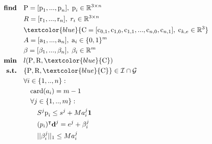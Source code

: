 \begin{align}
    \textrm{\textbf{find}}  \quad & \mbox{P}=[\mbox{p}_1,...,\mbox{p}_n], \; \mbox{p}_i \in \mathbb{R}^{3 \times n} \nonumber\\
                            \quad & R=[\mbox{r}_1,...,\mbox{r}_n], \; r_i \in \mathbb{R}^{3 \times n} \nonumber\\
                            \quad & \textcolor{blue}{\mbox{C}=[\mbox{c}_{0,1},\mbox{c}_{1,0},\mbox{c}_{1,1},...,\mbox{c}_{n,0},\mbox{c}_{n,1}], \; \mbox{c}_{k,e} \in \mathbb{R}^3} \nonumber\\
                            \quad & A=[\mbox{a}_1,...,\mbox{a}_n], \; \mbox{a}_i \in \{0,1\}^{m} \nonumber\\
                            \quad & \beta=[\beta_1,...,\beta_n], \; \beta_i \in \mathbb{R}^{m} \nonumber\\
    \textrm{\textbf{min}}  \quad & l(\mbox{P},\mbox{R},\textcolor{blue}{\mbox{C}}) \nonumber\\
    \textrm{\textbf{s.t.}}  \quad & \{\mbox{P},\mbox{R},\textcolor{blue}{\mbox{C}}\} \in \mathcal{I} \cap \mathcal{G} \nonumber\\
                            \quad & \forall i \in \{1,..,n\} : \nonumber\\
                                \quad & \quad \mbox{card}(a_i) = m-1  \nonumber\\
                                \quad & \quad \forall j \in \{1,..,m\} : \nonumber\\
                                    \quad & \quad \quad S^j \mbox{p}_i \leq s^j + M a_i^j \textbf{1} \nonumber\\
                                    \quad & \quad \quad (p_i)^{\intercal} \textbf{d}^j = e^j + \beta_i^j \nonumber\\
                                    \quad & \quad \quad ||\beta_i^j||_1 \leq M a_i^j \nonumber\\

\end{align}
